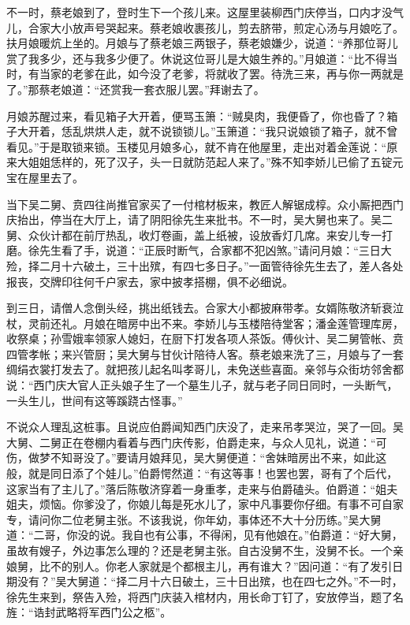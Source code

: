 不一时，蔡老娘到了，登时生下一个孩儿来。这屋里装柳西门庆停当，口内才没气儿，合家大小放声号哭起来。蔡老娘收裹孩儿，剪去脐带，煎定心汤与月娘吃了。扶月娘暖炕上坐的。月娘与了蔡老娘三两银子，蔡老娘嫌少，说道：“养那位哥儿赏了我多少，还与我多少便了。休说这位哥儿是大娘生养的。”月娘道：“比不得当时，有当家的老爹在此，如今没了老爹，将就收了罢。待洗三来，再与你一两就是了。”那蔡老娘道：“还赏我一套衣服儿罢。”拜谢去了。

月娘苏醒过来，看见箱子大开着，便骂玉箫：“贼臭肉，我便昏了，你也昏了？箱子大开着，恁乱烘烘人走，就不说锁锁儿。”玉箫道：“我只说娘锁了箱子，就不曾看见。”于是取锁来锁。玉楼见月娘多心，就不肯在他屋里，走出对着金莲说：“原来大姐姐恁样的，死了汉子，头一日就防范起人来了。”殊不知李娇儿已偷了五锭元宝在屋里去了。

当下吴二舅、贲四往尚推官家买了一付棺材板来，教匠人解锯成椁。众小厮把西门庆抬出，停当在大厅上，请了阴阳徐先生来批书。不一时，吴大舅也来了。吴二舅、众伙计都在前厅热乱，收灯卷画，盖上纸被，设放香灯几席。来安儿专一打磨。徐先生看了手，说道：“正辰时断气，合家都不犯凶煞。”请问月娘：“三日大殓，择二月十六破土，三十出殡，有四七多日子。”一面管待徐先生去了，差人各处报丧，交牌印往何千户家去，家中披孝搭棚，俱不必细说。

到三日，请僧人念倒头经，挑出纸钱去。合家大小都披麻带孝。女婿陈敬济斩衰泣杖，灵前还礼。月娘在暗房中出不来。李娇儿与玉楼陪待堂客；潘金莲管理库房，收祭桌；孙雪娥率领家人媳妇，在厨下打发各项人茶饭。傅伙计、吴二舅管帐、贲四管孝帐；来兴管厨；吴大舅与甘伙计陪待人客。蔡老娘来洗了三，月娘与了一套绸绢衣裳打发去了。就把孩儿起名叫孝哥儿，未免送些喜面。亲邻与众街坊邻舍都说：“西门庆大官人正头娘子生了一个墓生儿子，就与老子同日同时，一头断气，一头生儿，世间有这等蹊跷古怪事。”

不说众人理乱这桩事。且说应伯爵闻知西门庆没了，走来吊孝哭泣，哭了一回。吴大舅、二舅正在卷棚内看着与西门庆传影，伯爵走来，与众人见礼，说道：“可伤，做梦不知哥没了。”要请月娘拜见，吴大舅便道：“舍妹暗房出不来，如此这般，就是同日添了个娃儿。”伯爵愕然道：“有这等事！也罢也罢，哥有了个后代，这家当有了主儿了。”落后陈敬济穿着一身重孝，走来与伯爵磕头。伯爵道：“姐夫姐夫，烦恼。你爹没了，你娘儿每是死水儿了，家中凡事要你仔细。有事不可自家专，请问你二位老舅主张。不该我说，你年幼，事体还不大十分历练。”吴大舅道：“二哥，你没的说。我自也有公事，不得闲，见有他娘在。”伯爵道：“好大舅，虽故有嫂子，外边事怎么理的？还是老舅主张。自古没舅不生，没舅不长。一个亲娘舅，比不的别人。你老人家就是个都根主儿，再有谁大？”因问道：“有了发引日期没有？”吴大舅道：“择二月十六日破土，三十日出殡，也在四七之外。”不一时，徐先生来到，祭告入殓，将西门庆装入棺材内，用长命丁钉了，安放停当，题了名旌：“诰封武略将军西门公之柩”。

